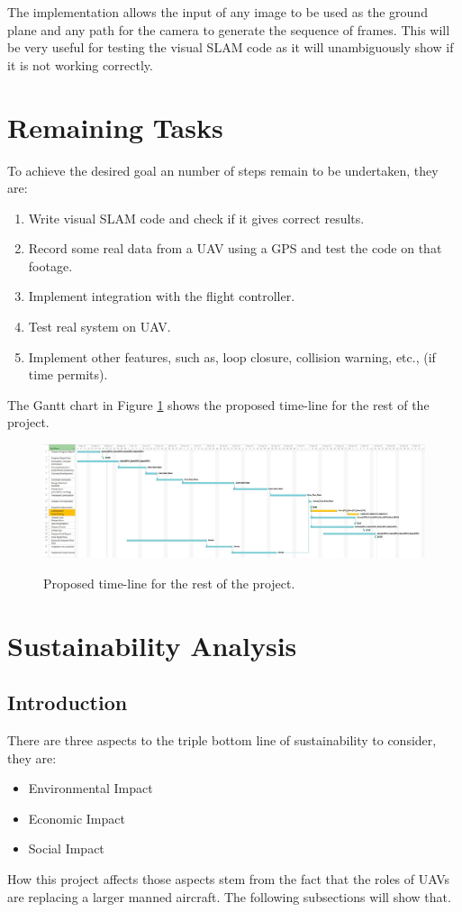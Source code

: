 \documentclass[a4paper,12pt]{article}
\begin{document}
 The implementation allows the input of any image to be used as the ground plane and any path for the camera to generate the sequence of frames. This will be very useful for testing the visual SLAM code as it will unambiguously show if it is not working correctly.
\section{Remaining Tasks\label{method}}
To achieve the desired goal an number of steps remain to be undertaken, they are:
\begin{enumerate}
	\item Write visual SLAM code and check if it gives correct results.
	\item Record some real data from a UAV using a GPS and test the code on that footage.
	\item Implement integration with the flight controller.
	\item Test real system on UAV.
	\item Implement other features, such as, loop closure, collision warning, etc., (if time permits).
\end{enumerate}

The Gantt chart in Figure \ref{fig:gantt} shows the proposed time-line for the rest of the project.
\begin{figure}[h]
	\centering
	\includegraphics[width=1.45\textwidth, angle=270]{ganttchart.jpg}
	\label{fig:gantt}
	\caption{Proposed time-line for the rest of the project.}
\end{figure}

\section{Sustainability Analysis}
\subsection{Introduction}
There are three aspects to the triple bottom line of sustainability to consider, they are:
\begin{itemize}
	\item Environmental Impact
	\item Economic Impact
	\item Social Impact
\end{itemize}
How this project affects those aspects stem from the fact that the roles of UAVs are replacing a larger manned aircraft. The following subsections will show that.
\end{document}
